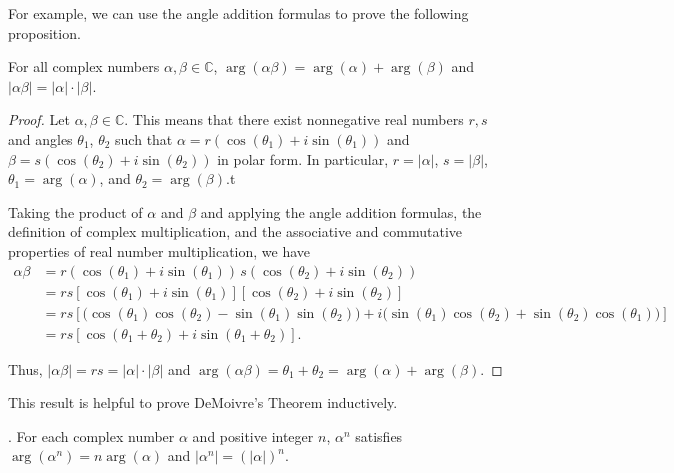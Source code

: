 \documentclass{article}
\begin{document}
For example, we can use the angle addition formulas to prove the following proposition.

\begin{prop*} For all complex numbers $\alpha, \beta \in \mathbb{C}$, $\arg(\alpha \beta) = \arg(\alpha) + \arg(\beta)$ and $|\alpha\beta| = |\alpha| \cdot |\beta|$.
\end{prop*}

\begin{proof}
Let $\alpha, \beta \in \mathbb{C}$.
This means that there exist nonnegative real numbers $r,s$ and angles $\theta_1$, $\theta_2$ such that $\alpha = r (\cos(\theta_1) + i \sin(\theta_1))$ and $\beta = s(\cos(\theta_2) + i \sin(\theta_2))$ in polar form.  In particular, $r = |\alpha|$, $s = |\beta|$, $\theta_1 = \arg(\alpha)$, and $\theta_2 = \arg(\beta)$.t

Taking the product of $\alpha$ and $\beta$ and applying the angle addition formulas, the definition of complex multiplication, and the associative and commutative properties of real number multiplication, we have
\begin{align*}
    \alpha \beta &= r (\cos(\theta_1) + i \sin(\theta_1))\, s(\cos(\theta_2) + i \sin(\theta_2)) \\
                 &= rs \left[\cos(\theta_1) + i \sin(\theta_1)\right] \left[\cos(\theta_2) + i \sin(\theta_2)\right] \\
                 &= rs \left[\big(\cos(\theta_1)\cos(\theta_2) - \sin(\theta_1)\sin(\theta_2)\big) + i \big(\sin(\theta_1)\cos(\theta_2) + \sin(\theta_2)\cos(\theta_1)\big)\right]\\
                 &= rs \left[\cos(\theta_1 + \theta_2) + i \sin(\theta_1 + \theta_2)\right].
\end{align*}

Thus, $|\alpha \beta| = rs = |\alpha|\cdot|\beta|$ and $\arg(\alpha \beta) = \theta_1 + \theta_2 = \arg(\alpha) + \arg(\beta)$.
\end{proof}

This result is helpful to prove DeMoivre's Theorem inductively.

\begin{theorem*}. For each complex number $\alpha$ and positive integer $n$, $\alpha^n$ satisfies $\arg(\alpha^n) = n\arg(\alpha)$ and $\left|\alpha^n\right| = (|\alpha|)^n$.

\end{theorem*}
\end{document}
